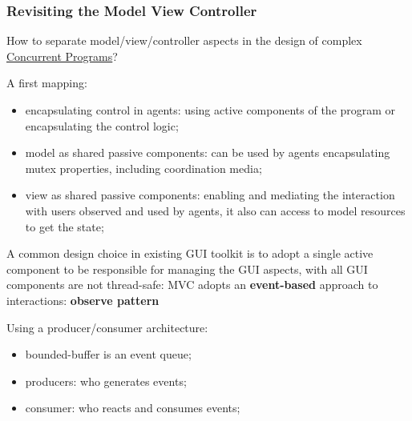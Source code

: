 \subsubsection{Revisiting the Model View Controller}\label{sub:ed_revisiting_the_model_view_controller} %
\begin{critical}[Issue]
    How to separate model/view/controller aspects in the design of complex \hyperref[def:conc-program]{Concurrent Programs}?
\end{critical}
A first mapping:
\begin{itemize}
    \item encapsulating control in agents: using active components of the program or encapsulating the control logic;
    \item model as shared passive components: can be used by agents encapsulating mutex properties, including coordination media;
    \item view as shared passive components: enabling and mediating the interaction with users observed and used by agents, it also can access to model resources to get the state;
\end{itemize}
\begin{critical}
    A common design choice in existing GUI toolkit is to adopt a single active component to be responsible for managing the GUI aspects, with all GUI components are not thread-safe: 
    \emptyln{}
    MVC adopts an \textbf{event-based} approach to interactions: \textbf{observe pattern}
    \begin{tip}
        Using a producer/consumer architecture:
        \begin{itemize}
            \item bounded-buffer is an event queue;
            \item producers: who generates events;
            \item consumer: who reacts and consumes events;
        \end{itemize}
    \end{tip}
\end{critical}
